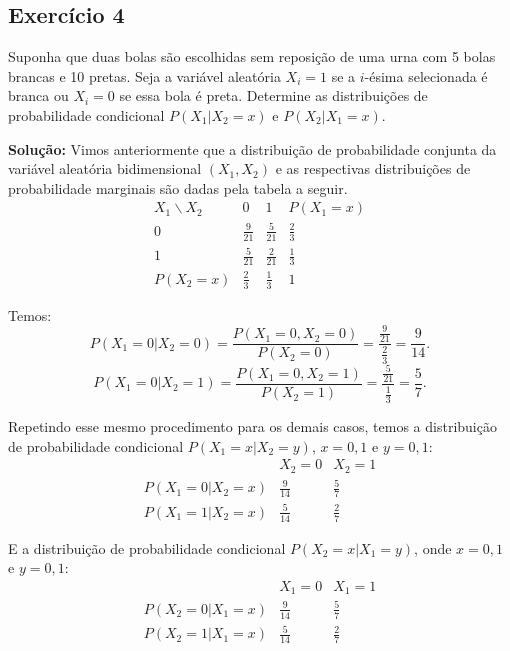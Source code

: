 \documentclass{article}
\begin{document}
\subsection{Exercício 4}
Suponha que duas bolas são escolhidas sem reposição de uma urna com 5 bolas brancas e 10 pretas. Seja a variável aleatória $X_i = 1$ se a $i$-ésima selecionada é branca ou $X_i = 0$ se essa bola é preta. Determine as distribuições de probabilidade condicional $P(X_1|X_2 = x)$ e $P(X_2|X_1 = x)$.

\vspace{0.5cm}
\textbf{Solução:} Vimos anteriormente que a distribuição de probabilidade conjunta da variável aleatória bidimensional $(X_1, X_2)$ e as respectivas distribuições de probabilidade marginais são dadas pela tabela a seguir.
    $$
    \begin{array}{c|cc|c}
    X_1\backslash X_2 & 0 & 1 & P(X_1 = x) \\
    \hline
    0 & \frac{9}{21} & \frac{5}{21} & \frac{2}{3} \\
    1 & \frac{5}{21} & \frac{2}{21} & \frac{1}{3} \\
    \hline
    P(X_2 = x) & \frac{2}{3} & \frac{1}{3} & 1
    \end{array}
    $$

Temos:  
    $$
    P(X_1 = 0|X_2 = 0) = \frac{P(X_1 = 0, X_2 = 0)}{P(X_2 = 0)} = 
    \frac{\frac{9}{21}}{\frac{2}{3}} = \frac{9}{14}.
    $$
    $$
    P(X_1 = 0|X_2 = 1) = \frac{P(X_1 = 0, X_2 = 1)}{P(X_2 = 1)} = 
    \frac{\frac{5}{21}}{\frac{1}{3}} = \frac{5}{7}.
    $$
    
Repetindo esse mesmo procedimento para os demais casos, temos a distribuição de probabilidade condicional 
$P(X_1 = x|X_2 = y)$, $x = 0, 1$ e $y = 0, 1$:
    $$
    \begin{array}{c|cc}
    & X_2 = 0 & X_2 = 1 \\
    \hline
    P(X_1 = 0|X_2 = x) & \frac{9}{14} & \frac{5}{7} \\
    P(X_1 = 1|X_2 = x) & \frac{5}{14} & \frac{2}{7}
    \end{array}
    $$

E a distribuição de probabilidade condicional 
$P(X_2 = x|X_1 = y)$, onde $x = 0, 1$ e $y = 0, 1$:
    $$
    \begin{array}{c|cc}
    & X_1 = 0 & X_1 = 1 \\
    \hline
    P(X_2 = 0|X_1 = x) & \frac{9}{14} & \frac{5}{7} \\
    P(X_2 = 1|X_1 = x) & \frac{5}{14} & \frac{2}{7}
    \end{array}
    $$
\end{document}

